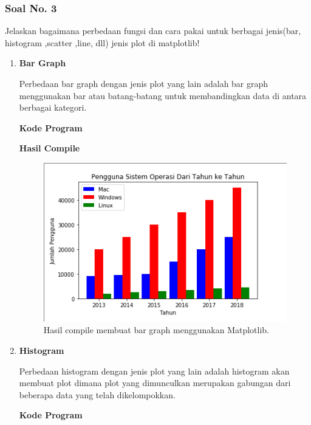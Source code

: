\subsubsection{Soal No. 3}
\hfill \break
Jelaskan bagaimana perbedaan fungsi dan cara pakai untuk berbagai jenis(bar, histogram ,scatter ,line, dll) jenis plot di matplotlib!

\begin{enumerate}
	\item \textbf{Bar Graph}
	
	Perbedaan bar graph dengan jenis plot yang lain adalah bar graph menggunakan bar atau batang-batang untuk membandingkan data di antara berbagai kategori.
	
	\textbf{Kode Program}
	
	
	
	\textbf{Hasil Compile}
	
	\begin{figure}[H]
		\includegraphics[width=12cm]{figures/6/1174031/bar.png}
		\centering
		\caption{Hasil compile membuat bar graph menggunakan Matplotlib.}
	\end{figure}
	
	\item \textbf{Histogram}
	
	Perbedaan histogram dengan jenis plot yang lain adalah histogram akan membuat plot dimana plot yang dimunculkan merupakan gabungan dari beberapa data yang telah dikelompokkan.
	
	\textbf{Kode Program}
	
	
	

\end{enumerate}
